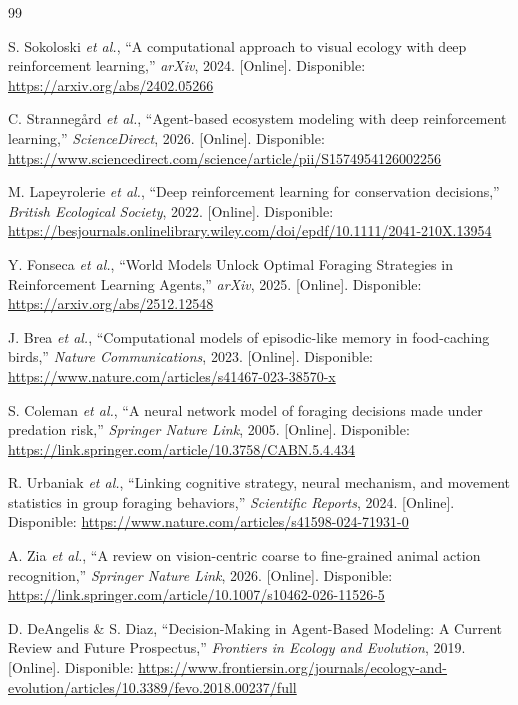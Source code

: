 \documentclass[conference]{IEEEtran}
\begin{document}

\begin{thebibliography}{99}

S. Sokoloski \textit{et al.}, ``A computational approach to visual ecology with deep reinforcement learning,'' \textit{arXiv}, 2024. [Online]. Disponible: \url{https://arxiv.org/abs/2402.05266}

C. Strannegård \textit{et al.}, ``Agent-based ecosystem modeling with deep reinforcement learning,'' \textit{ScienceDirect}, 2026. [Online]. Disponible: \url{https://www.sciencedirect.com/science/article/pii/S1574954126002256}

M. Lapeyrolerie \textit{et al.}, ``Deep reinforcement learning for conservation decisions,'' \textit{British Ecological Society}, 2022. [Online]. Disponible: \url{https://besjournals.onlinelibrary.wiley.com/doi/epdf/10.1111/2041-210X.13954}

Y. Fonseca \textit{et al.}, ``World Models Unlock Optimal Foraging Strategies in Reinforcement Learning Agents,'' \textit{arXiv}, 2025. [Online]. Disponible: \url{https://arxiv.org/abs/2512.12548}

J. Brea \textit{et al.}, ``Computational models of episodic-like memory in food-caching birds,'' \textit{Nature Communications}, 2023. [Online]. Disponible: \url{https://www.nature.com/articles/s41467-023-38570-x}

S. Coleman \textit{et al.}, ``A neural network model of foraging decisions made under predation risk,'' \textit{Springer Nature Link}, 2005. [Online]. Disponible: \url{https://link.springer.com/article/10.3758/CABN.5.4.434}

R. Urbaniak \textit{et al.}, ``Linking cognitive strategy, neural mechanism, and movement statistics in group foraging behaviors,'' \textit{Scientific Reports}, 2024. [Online]. Disponible: \url{https://www.nature.com/articles/s41598-024-71931-0}

A. Zia \textit{et al.}, ``A review on vision-centric coarse to fine-grained animal action recognition,'' \textit{Springer Nature Link}, 2026. [Online]. Disponible: \url{https://link.springer.com/article/10.1007/s10462-026-11526-5}

D. DeAngelis \& S. Diaz, ``Decision-Making in Agent-Based Modeling: A Current Review and Future Prospectus,'' \textit{Frontiers in Ecology and Evolution}, 2019. [Online]. Disponible: \url{https://www.frontiersin.org/journals/ecology-and-evolution/articles/10.3389/fevo.2018.00237/full}


\end{thebibliography}
\end{document}
